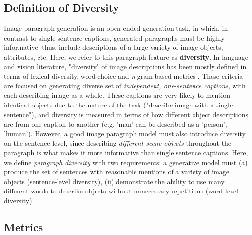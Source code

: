 \documentclass[11pt,a4paper]{article}
\begin{document}
\subsection{Definition of Diversity}
Image paragraph generation is an open-ended generation task, in which, in contrast to single sentence captions, generated paragraphs must be highly informative, thus, include descriptions of a large variety of image objects, attributes, etc.
Here, we refer to this paragraph feature as \textbf{diversity}.
In language and vision literature, "diversity" of image descriptions has been mostly defined in terms of lexical diversity, word choice and \textit{n}-gram based metrics \cite{Devlin2015, Vijayakumar2016, Lindh2018, VanMiltenburg2018}.
These criteria are focused on generating diverse set of \textit{independent, one-sentence captions}, with each describing image as a whole.
These captions are very likely to mention identical objects due to the nature of the task ("describe image with a single sentence"), and diversity is measured in terms of how different object descriptions are from one caption to another (e.g. 'man' can be described as a 'person', 'human').
However, a good image paragraph model must also introduce diversity on the sentence level, since describing \textit{different scene objects} throughout the paragraph is what makes it more informative than single sentence captions.
Here, we define \textit{paragraph diversity} with two requirements: a generative model must (a) produce the set of sentences with reasonable mentions of a variety of image objects (sentence-level diversity), (ii) demonstrate the ability to use many different words to describe objects without unnecessary repetitions (word-level diversity).


\subsection{Metrics}
\end{document}
